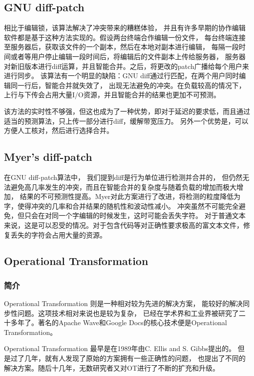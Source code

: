 \documentclass[11pt]{article}
\begin{document}
\subsection{GNU diff-patch}
相比于编辑锁，该算法解决了冲突带来的糟糕体验，
并且有许多早期的协作编辑软件都是基于这种方法实现的。假设两台终端合作编辑一份文件，
每台终端连接至服务器后，获取该文件的一个副本，然后在本地对副本进行编辑，
每隔一段时间或者等用户停止编辑一段时间后，将编辑后的文件副本上传给服务器，
服务器对新旧版本进行diff运算，并且智能合并。之后，将更改的patch广播给每个用户来进行同步。
该算法有一个明显的缺陷：GNU diff通过行匹配，在两个用户同时编辑同一行后，智能合并就失效了，
出现无法避免的冲突。在负载较高的情况下，上行与下传会占用大量I/O资源，并且智能合并的结果也更加不可预测。

该方法的实时性不够强，但这也成为了一种优势，即对于延迟的要求低，而且通过适当的预测算法，只上传一部分进行diff，缓解带宽压力。
另外一个优势是，可以方便人工核对，然后进行选择合并。

\subsection{Myer's diff-patch}
在GNU diff-patch算法中，
我们提到diff是行为单位进行检测并合并的，
但仍然无法避免高几率发生的冲突，而且在智能合并的复杂度与随着负载的增加而极大增加，
结果的不可预测性提高。Myer对此方案进行了改进，将检测的粒度降低为字，使得冲突的几率和合并结果的随机性和波动性减小。
冲突虽然不可能完全避免，但只会在对同一个字编辑的时候发生，这时可能会丢失字符。
对于普通文本来说，这是可以忍受的情况。对于包含代码等对正确性要求极高的富文本文件，修复丢失的字符会占用大量的资源。


\subsection{Operational Transformation}
\subsubsection{简介}
Operational Transformation 则是一种相对较为先进的解决方案，
能较好的解决同步性问题。这项技术相对来说也是较为复杂，
已经在学术界和工业界被研究了二十多年了。著名的Apache Wave和Google Docs的核心技术便是Operational Transformation。

Operational Transformation
最早是在1989年由C. Ellis and S. Gibbs提出的。
但是过了几年，就有人发现了原始的方案拥有一些正确性的问题，
也提出了不同的解决方案。随后十几年，无数研究者又对OT进行了不断的扩充和升级。
\end{document}
